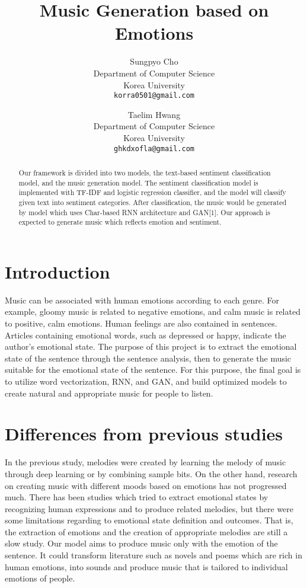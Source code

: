 \documentclass{article}
\title{Music Generation based on Emotions}
\author{
  Sungpyo Cho\\
  Department of Computer Science\\
  Korea University\\
  \texttt{korra0501@gmail.com}
  \and
  Taelim Hwang\\
  Department of Computer Science\\
  Korea University\\
  \texttt{ghkdxofla@gmail.com}
  }
\begin{document}

\maketitle

\begin{abstract}
    Our framework is divided into two models, the text-based sentiment classification model, and the music generation model. The sentiment classification model is implemented with TF-IDF and logistic regression classifier, and the model will classify given text into sentiment categories. After classification, the music would be generated by model which uses Char-based RNN architecture and GAN[1]. Our approach is expected to generate music which reflects emotion and sentiment.
\end{abstract}

\section{Introduction}

Music can be associated with human emotions according to each genre. For example, gloomy music is related to negative emotions, and calm music is related to positive, calm emotions. Human feelings are also contained in sentences. Articles containing emotional words, such as depressed or happy, indicate the author's emotional state. The purpose of this project is to extract the emotional state of the sentence through the sentence analysis, then to generate the music suitable for the emotional state of the sentence. For this purpose, the final goal is to utilize word vectorization, RNN, and GAN, and build optimized models to create natural and appropriate music for people to listen.

\section{Differences from previous studies}

In the previous study, melodies were created by learning the melody of music through deep learning or by combining sample bits. On the other hand, research on creating music with different moods based on emotions has not progressed much. There has been studies which tried to extract emotional states by recognizing human expressions and to produce related melodies, but there were some limitations regarding to emotional state definition and outcomes. That is, the extraction of emotions and the creation of appropriate melodies are still a slow study. Our model aims to produce music only with the emotion of the sentence. It could transform literature such as novels and poems which are rich in human emotions, into sounds and produce music that is tailored to individual emotions of people.
\end{document}
